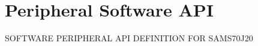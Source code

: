 \hypertarget{group__SAMS70J20__api}{}\section{Peripheral Software A\+PI}
\label{group__SAMS70J20__api}
S\+O\+F\+T\+W\+A\+RE P\+E\+R\+I\+P\+H\+E\+R\+AL A\+PI D\+E\+F\+I\+N\+I\+T\+I\+ON F\+OR S\+A\+M\+S70\+J20 